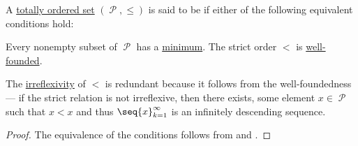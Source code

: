 \begin{definition}\label{def:well_ordered_set}
  A \hyperref[def:totally_ordered_set]{totally ordered set} \( (\mscrP, \leq) \) is said to be  if either of the following equivalent conditions hold:
  \begin{thmenum}
     Every nonempty subset of \( \mscrP \) has a \hyperref[def:partially_ordered_set_extremal_points/maximum_and_minimum]{minimum}.
     The strict order \( < \) is \hyperref[def:well_founded_relation]{well-founded}.
  \end{thmenum}

  The \hyperref[def:binary_relation/irreflexive]{irreflexivity} of \( < \) is redundant because it follows from the well-foundedness --- if the strict relation is not irreflexive, then there exists, some element \( x \in \mscrP \) such that \( x < x \) and thus \( \seq{ x }_{k=1}^\infty \) is an infinitely descending sequence.
\end{definition}
\begin{proof}
  The equivalence of the conditions follows from  and .
\end{proof}

